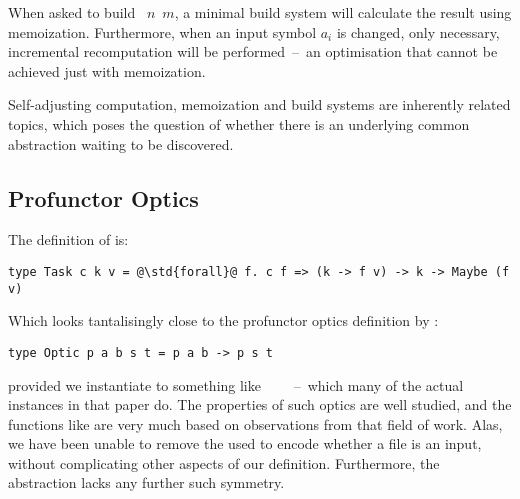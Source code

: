 \noindent
When asked to build ~$n$~$m$, a minimal build system will calculate the
result using memoization. Furthermore, when an input symbol $a_i$ is changed,
only necessary, incremental recomputation will be performed~--~an optimisation
that cannot be achieved just with memoization.

Self-adjusting computation, memoization and build systems are inherently related
topics, which poses the question of whether there is an underlying common
abstraction waiting to be discovered.

\subsection{Profunctor Optics}\label{sec-related-optics}

The definition of  is:

\begin{verbatim}
type Task c k v = @\std{forall}@ f. c f => (k -> f v) -> k -> Maybe (f v)
\end{verbatim}

\noindent
Which looks tantalisingly close to the profunctor optics definition by
\cite{pickering2017profunctor}:

\begin{verbatim}
type Optic p a b s t = p a b -> p s t
\end{verbatim}
\noindend
provided we instantiate  to something like
~\hs{->}~~~--~which many of the actual instances in that paper
do. The properties of such optics are well studied, and the functions like
 are very much based on observations from that field of work.
Alas, we have been unable to remove the  used to encode whether a file
is an input, without complicating other aspects of our definition. Furthermore,
the  abstraction lacks any further such symmetry.
